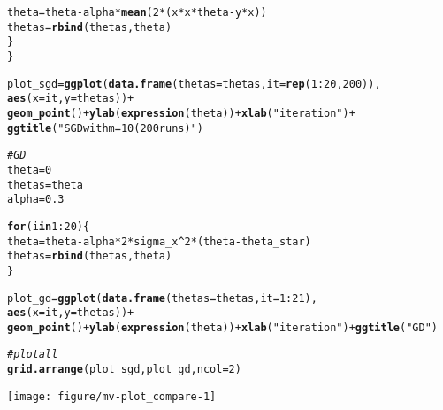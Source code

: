 \documentclass[a4paper]{article}
\makeatletter
\newcommand{\hlnum}[1]{\textcolor[rgb]{0.686,0.059,0.569}{#1}}%
\newcommand{\hlstr}[1]{\textcolor[rgb]{0.192,0.494,0.8}{#1}}%
\newcommand{\hlcom}[1]{\textcolor[rgb]{0.678,0.584,0.686}{\textit{#1}}}%
\newcommand{\hlopt}[1]{\textcolor[rgb]{0,0,0}{#1}}%
\newcommand{\hlstd}[1]{\textcolor[rgb]{0.345,0.345,0.345}{#1}}%
\newcommand{\hlkwa}[1]{\textcolor[rgb]{0.161,0.373,0.58}{\textbf{#1}}}%
\newcommand{\hlkwb}[1]{\textcolor[rgb]{0.69,0.353,0.396}{#1}}%
\newcommand{\hlkwc}[1]{\textcolor[rgb]{0.333,0.667,0.333}{#1}}%
\newcommand{\hlkwd}[1]{\textcolor[rgb]{0.737,0.353,0.396}{\textbf{#1}}}%
\newenvironment{kframe}{%
 \def\at@end@of@kframe{}%
 \ifinner\ifhmode%
  \def\at@end@of@kframe{\end{minipage}}%
  \begin{minipage}{\columnwidth}%
 \fi\fi%
 \def\FrameCommand##1{\hskip\@totalleftmargin \hskip-\fboxsep
 \colorbox{shadecolor}{##1}\hskip-\fboxsep
     \hskip-\linewidth \hskip-\@totalleftmargin \hskip\columnwidth}%
 \MakeFramed {\advance\hsize-\width
   \@totalleftmargin\z@ \linewidth\hsize
   \@setminipage}}%
 {\par\unskip\endMakeFramed%
 \at@end@of@kframe}
\newenvironment{knitrout}{}{} %
\makeatother
\begin{document}
{\begin{enumerate}
\begin{knitrout}
\begin{kframe}
\begin{alltt}
    \hlstd{theta} \hlkwb{=} \hlstd{theta}  \hlopt{-} \hlstd{alpha} \hlopt{*} \hlkwd{mean}\hlstd{(}\hlnum{2}\hlopt{*}\hlstd{(x}\hlopt{*}\hlstd{x}\hlopt{*}\hlstd{theta} \hlopt{-} \hlstd{y}\hlopt{*}\hlstd{x))}
    \hlstd{thetas} \hlkwb{=} \hlkwd{rbind}\hlstd{(thetas, theta)}
  \hlstd{\}}
\hlstd{\}}

\hlstd{plot_sgd} \hlkwb{=} \hlkwd{ggplot}\hlstd{(}\hlkwd{data.frame}\hlstd{(}\hlkwc{thetas} \hlstd{= thetas,} \hlkwc{it} \hlstd{=} \hlkwd{rep}\hlstd{(}\hlnum{1}\hlopt{:}\hlnum{20}\hlstd{,} \hlnum{200}\hlstd{)),}
       \hlkwd{aes}\hlstd{(}\hlkwc{x} \hlstd{= it,} \hlkwc{y} \hlstd{= thetas))} \hlopt{+}
  \hlkwd{geom_point}\hlstd{()} \hlopt{+} \hlkwd{ylab}\hlstd{(}\hlkwd{expression}\hlstd{(theta))} \hlopt{+} \hlkwd{xlab}\hlstd{(}\hlstr{"iteration"}\hlstd{)} \hlopt{+}
  \hlkwd{ggtitle}\hlstd{(}\hlstr{"SGD with m=10 (200 runs)"}\hlstd{)}

\hlcom{# GD}
\hlstd{theta} \hlkwb{=} \hlnum{0}
\hlstd{thetas} \hlkwb{=} \hlstd{theta}
\hlstd{alpha} \hlkwb{=} \hlnum{0.3}

\hlkwa{for}\hlstd{(i} \hlkwa{in} \hlnum{1}\hlopt{:}\hlnum{20}\hlstd{)\{}
  \hlstd{theta} \hlkwb{=} \hlstd{theta}  \hlopt{-} \hlstd{alpha} \hlopt{*}  \hlnum{2}\hlopt{*}\hlstd{sigma_x}\hlopt{^}\hlnum{2}\hlopt{*}\hlstd{(theta} \hlopt{-} \hlstd{theta_star)}
  \hlstd{thetas} \hlkwb{=} \hlkwd{rbind}\hlstd{(thetas, theta)}
\hlstd{\}}

\hlstd{plot_gd} \hlkwb{=} \hlkwd{ggplot}\hlstd{(}\hlkwd{data.frame}\hlstd{(}\hlkwc{thetas} \hlstd{= thetas,} \hlkwc{it} \hlstd{=} \hlnum{1}\hlopt{:}\hlnum{21}\hlstd{),}
                 \hlkwd{aes}\hlstd{(}\hlkwc{x} \hlstd{= it,} \hlkwc{y} \hlstd{= thetas))} \hlopt{+}
  \hlkwd{geom_point}\hlstd{()} \hlopt{+} \hlkwd{ylab}\hlstd{(}\hlkwd{expression}\hlstd{(theta))} \hlopt{+} \hlkwd{xlab}\hlstd{(}\hlstr{"iteration"}\hlstd{)} \hlopt{+} \hlkwd{ggtitle}\hlstd{(}\hlstr{"GD"}\hlstd{)}

\hlcom{# plot all}
\hlkwd{grid.arrange}\hlstd{(plot_sgd, plot_gd,} \hlkwc{ncol}\hlstd{=}\hlnum{2}\hlstd{)}
\end{alltt}
\end{kframe}
\texttt{[image: figure/mv-plot\_compare-1]} 
\end{knitrout}
\end{enumerate}
}
\end{document}
